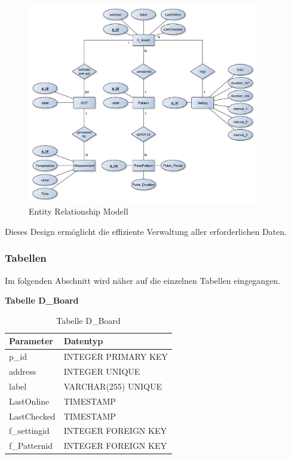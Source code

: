 \begin{figure}[H]
\begin{center}
\includegraphics[width=0.9\textwidth]{img/general/ER_Diagramm.pdf}
\caption{Entity Relationship Modell}
\label{ERM}
\end{center}
\end{figure}

Dieses Design ermöglicht die effiziente Verwaltung aller erforderlichen Daten. 

\newpage
\subsubsection{Tabellen}
Im folgenden Abschnitt wird näher auf die einzelnen Tabellen eingegangen. 


\textbf{Tabelle D\_Board}\\

\begin{table}[H]
\begin{center}
\begin{tabular}{|l|l|}\hline
Parameter & Datentyp \\ \hline
p\_id & INTEGER PRIMARY KEY\\ 
address & INTEGER UNIQUE\\ 
label & VARCHAR(255) UNIQUE\\ 
LastOnline & TIMESTAMP\\ 
LastChecked & TIMESTAMP\\ 
f\_settingid & INTEGER FOREIGN KEY\\
f\_Patternid & INTEGER FOREIGN KEY\\ \hline
\end{tabular}
\caption{Tabelle D\_Board}
\label{table_TabelleD_Board}
\end{center}
\end{table}



